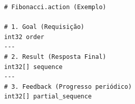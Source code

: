 \documentclass[preview,border=2pt]{standalone}
\begin{document}
\begin{lstlisting}[style=textstyle]
# Fibonacci.action (Exemplo)

# 1. Goal (Requisição)
int32 order
---
# 2. Result (Resposta Final)
int32[] sequence
---
# 3. Feedback (Progresso periódico)
int32[] partial_sequence
\end{lstlisting}
\end{document}
